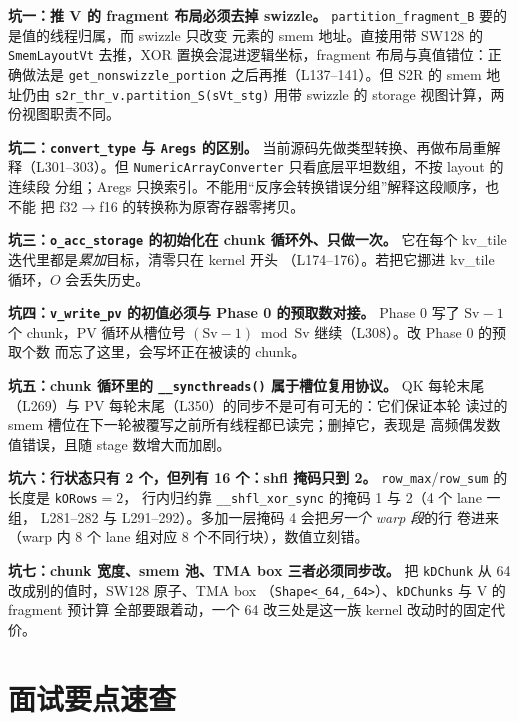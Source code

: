 \textbf{坑一：推 V 的 fragment 布局必须去掉 swizzle。}
\texttt{partition\_\allowbreak{}fragment\_\allowbreak{}B} 要的是值的线程归属，而 swizzle 只改变
元素的 smem 地址。直接用带 SW128 的 \texttt{Smem\allowbreak{}Layout\allowbreak{}Vt} 去推，XOR
置换会混进逻辑坐标，fragment 布局与真值错位：正确做法是
\texttt{get\_\allowbreak{}nonswizzle\_\allowbreak{}portion} 之后再推（L137--141）。但 S2R 的
smem 地址仍由 \texttt{s2r\_thr\_v.partition\_S(sVt\_stg)} 用带 swizzle 的 storage
视图计算，两份视图职责不同。

\textbf{坑二：\texttt{convert\_\allowbreak{}type} 与 \texttt{Aregs} 的区别。}
当前源码先做类型转换、再做布局重解释（L301--303）。但
\texttt{NumericArrayConverter} 只看底层平坦数组，不按 layout 的连续段
分组；Aregs 只换索引。不能用“反序会转换错误分组”解释这段顺序，也不能
把 f32$\to$f16 的转换称为原寄存器零拷贝。

\textbf{坑三：\texttt{o\_\allowbreak{}acc\_\allowbreak{}storage} 的初始化在 chunk 循环外、只做一次。}
它在每个 kv\_tile 迭代里都是\emph{累加}目标，清零只在 kernel 开头
（L174--176）。若把它挪进 kv\_tile 循环，$O$ 会丢失历史。

\textbf{坑四：\texttt{v\_write\_pv} 的初值必须与 Phase 0 的预取数对接。}
Phase 0 写了 $\mathrm{Sv}-1$ 个 chunk，PV 循环从槽位号
$(\mathrm{Sv}-1)\bmod \mathrm{Sv}$ 继续（L308）。改 Phase 0 的预取个数
而忘了这里，会写坏正在被读的 chunk。

\textbf{坑五：chunk 循环里的 \texttt{\_\allowbreak{}\_\allowbreak{}syncthreads\allowbreak{}()} 属于槽位复用协议。}
QK 每轮末尾（L269）与 PV 每轮末尾（L350）的同步不是可有可无的：它们保证本轮
读过的 smem 槽位在下一轮被覆写之前所有线程都已读完；删掉它，表现是
高频偶发数值错误，且随 stage 数增大而加剧。

\textbf{坑六：行状态只有 2 个，但列有 16 个：shfl 掩码只到 2。}
\texttt{row\_max}/\texttt{row\_sum} 的长度是 \texttt{kORows}$=2$，
行内归约靠 \texttt{\_\allowbreak{}\_\allowbreak{}shfl\_\allowbreak{}xor\_\allowbreak{}sync} 的掩码 1 与 2（4 个 lane 一组，
L281--282 与 L291--292）。多加一层掩码 4 会把\emph{另一个 warp 段}的行
卷进来（warp 内 8 个 lane 组对应 8 个不同行块），数值立刻错。

\textbf{坑七：chunk 宽度、smem 池、TMA box 三者必须同步改。}
把 \texttt{kDChunk} 从 64 改成别的值时，SW128 原子、TMA box
（\texttt{Shape\allowbreak{}<\_\allowbreak{}64,\allowbreak{}\_\allowbreak{}64>}）、\texttt{kDChunks} 与 V 的 fragment 预计算
全部要跟着动，一个 64 改三处是这一族 kernel 改动时的固定代价。

\section{面试要点速查}

